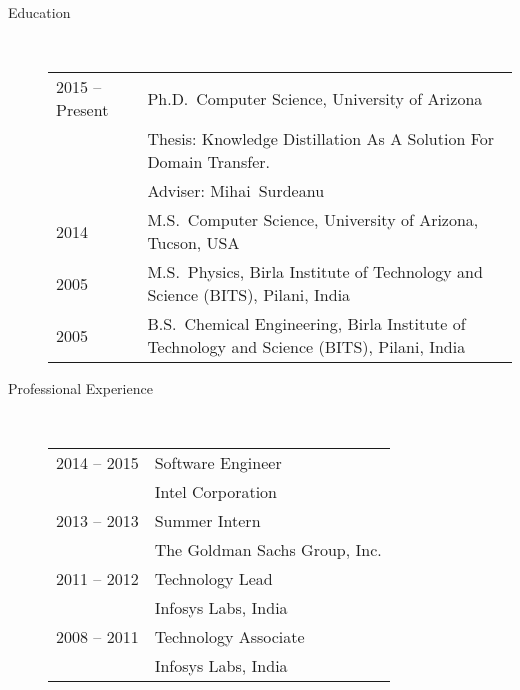 \documentclass[10pt]{article}
\begin{document}
\begin{description}

\item [Education]\

\begin{tabular}{lp{4.5in}}
\hspace{-.2cm}2015 -- Present &  Ph.D.~Computer Science, {\sc University of Arizona}
\\\vspace{.0cm}&Thesis: Knowledge Distillation As A Solution For Domain Transfer.
\\\vspace{.1cm}& Adviser: Mihai~Surdeanu\\
\vspace{.1cm}\hspace{-.2cm}2014 &  M.S.~Computer Science, {\sc University of Arizona, Tucson, USA} \\
\vspace{.1cm}\hspace{-.2cm}2005 &  M.S.~Physics, {\sc Birla Institute of Technology and Science (BITS), Pilani, India} \\
\hspace{-.2cm}2005 & B.S.~Chemical Engineering,  {\sc Birla Institute of Technology and Science (BITS), Pilani, India}
\end{tabular}


\item [Professional Experience]\

\begin{tabular}{lp{4.9in}}


\hspace{-.2cm}2014 -- 2015 & Software Engineer\\\vspace{.1cm}
& {\sc Intel Corporation} \\

\hspace{-.2cm}2013 -- 2013 & Summer Intern\\\vspace{.1cm}
& {\sc The Goldman Sachs Group, Inc.} \\

\hspace{-.2cm}2011 -- 2012 & Technology Lead\\\vspace{.1cm}
&  {\sc Infosys Labs, India} \\

\hspace{-.2cm}2008 -- 2011 & Technology Associate\\\vspace{.1cm}
& {\sc Infosys Labs, India} \\


\end{tabular}
\end{description}
\end{document}

